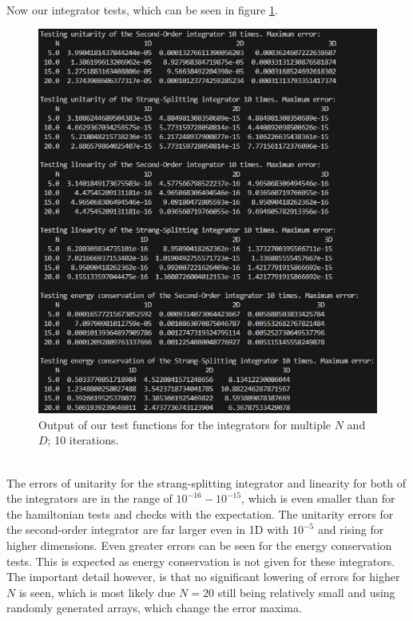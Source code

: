 \documentclass[11pt, letterpaper, onecolumn]{article}
\begin{document}
	\\
	Now our integrator tests, which can be seen in figure \ref{fig:test-integrators}. 
	\begin{figure} [h] 
	\begin{center}
	\includegraphics[width=13cm]{"test_integrators2.png"}
	\caption{Output of our test functions for the integrators for multiple $N$ and $D$; 10 iterations.} \label{fig:test-integrators}
	\end{center}
	\end{figure}
	\\
	The errors of unitarity for the strang-splitting integrator and linearity for both of the integrators are in the range of $10^{-16}-10^{-15}$, which is even smaller than for the hamiltonian tests and checks with the expectation. The unitarity errors for the second-order integrator are far larger even in 1D with $10^{-5}$ and rising for higher dimensions. Even greater errors can be seen for the energy conservation tests. This is expected as energy conservation is not given for these integrators. The important detail however, is that no significant lowering of errors for higher $N$ is seen, which is most likely due $N=20$ still being relatively small and using randomly generated arrays, which change the error maxima.
\end{document}
